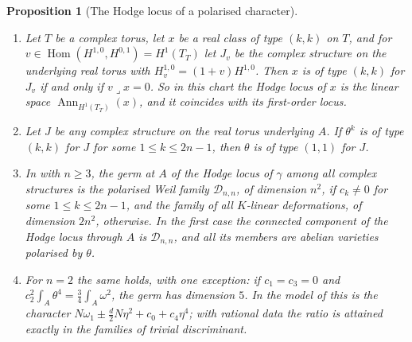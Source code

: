 \documentclass[11pt,reqno]{amsart}
\theoremstyle{plain}
\newtheorem{proposition}[theorem]{Proposition}
\theoremstyle{definition}
\theoremstyle{remark}
\newcommand{\cD}{\mathcal{D}}
\DeclareMathOperator{\Hom}{Hom}
\DeclareMathOperator{\Ann}{Ann}
\begin{document}
\begin{proposition}[The Hodge locus of a polarised character]
\label{prop:p2primelocus}
\begin{enumerate}[label=\textup{(\roman*)},leftmargin=2.6em,itemsep=2pt]
\item Let $T$ be a complex torus, let $x$ be a real class of type $(k,k)$ on
  $T$, and for $v\in\Hom(H^{1,0},H^{0,1})=H^{1}(T_{T})$ let $J_{v}$ be the
  complex structure on the underlying real torus with $H^{1,0}_{v}=(1+v)H^{1,0}$.
  Then $x$ is of type $(k,k)$ for $J_{v}$ if and only if $v\lrcorner x=0$. So
  in this chart the Hodge locus of $x$ is the linear space
  $\Ann_{H^{1}(T_{T})}(x)$, and it coincides with its first-order locus.
\item Let $J$ be any complex structure on the real torus underlying $A$. If
  $\theta^{k}$ is of type $(k,k)$ for $J$ for some $1\le k\le2n-1$, then
  $\theta$ is of type $(1,1)$ for $J$.
\item In  with $n\ge3$, the germ at $A$ of the Hodge locus
  of $\gamma$ among all complex structures is the polarised Weil family
  $\cD_{n,n}$, of dimension $n^{2}$, if $c_{k}\ne0$ for some $1\le k\le2n-1$,
  and the family of all $K$-linear deformations, of dimension $2n^{2}$,
  otherwise. In the first case the connected component of the Hodge locus
  through $A$ is $\cD_{n,n}$, and all its members are abelian varieties
  polarised by $\theta$.
\item For $n=2$ the same holds, with one exception: if $c_{1}=c_{3}=0$ and
  $c_{2}^{2}\int_{A}\theta^{4}=\tfrac34\int_{A}\omega^{2}$, the germ has
  dimension $5$. In the model of \cite[Setup~4.1]{paperI} this is
  the character $N\omega_{1}\pm\tfrac{d}{2}N\eta^{2}+c_{0}+c_{4}\eta^{4}$;
  with rational data the ratio is attained exactly in the families of trivial
  discriminant.
\end{enumerate}
\end{proposition}
\end{document}
